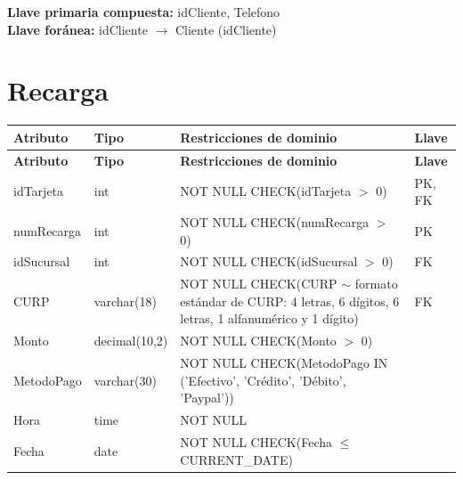 \documentclass[12pt]{article}
\begin{document}
\vspace{2pt}
\textbf{Llave primaria compuesta:} idCliente, Telefono\\
\textbf{Llave foránea:} idCliente $\rightarrow$ Cliente (idCliente)\\


\section*{Recarga}

\begin{longtable}{p{3.5cm} p{2.5cm} p{7.5cm} p{1.5cm}}
\label{tab:recarga}\\
\toprule
\textbf{Atributo} & \textbf{Tipo} & \textbf{Restricciones de dominio} & \textbf{Llave} \\
\midrule
\endfirsthead

\toprule
\textbf{Atributo} & \textbf{Tipo} & \textbf{Restricciones de dominio} & \textbf{Llave} \\
\midrule
\endhead
\bottomrule
\endfoot

idTarjeta 
& int 
& NOT NULL \newline CHECK(idTarjeta $>$ 0)
& PK, FK \\

numRecarga 
& int 
& NOT NULL \newline CHECK(numRecarga $>$ 0)
& PK \\

idSucursal 
& int 
& NOT NULL \newline CHECK(idSucursal $>$ 0)
& FK \\

CURP 
& varchar(18) 
& NOT NULL \newline CHECK(CURP $\sim$ formato estándar de CURP: 4 letras, 6 dígitos, 6 letras, 1 alfanumérico y 1 dígito)
& FK \\

Monto 
& decimal(10,2) 
& NOT NULL \newline CHECK(Monto $>$ 0)
&  \\

MetodoPago 
& varchar(30) 
& NOT NULL \newline CHECK(MetodoPago IN ('Efectivo', 'Crédito', 'Débito', 'Paypal'))
&  \\

Hora 
& time 
& NOT NULL
&  \\

Fecha 
& date 
& NOT NULL \newline CHECK(Fecha $\leq$ CURRENT\_DATE)
&  \\

\end{longtable}
\end{document}
